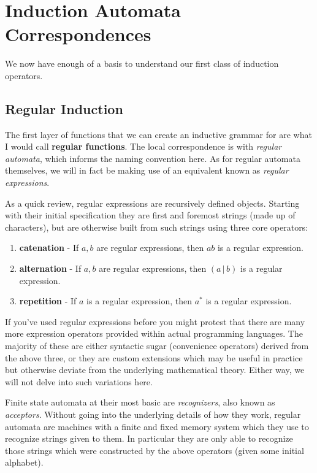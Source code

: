 \documentclass[twoside]{article}
\newcommand{\strong}[1]{{\bfseries #1}}
\begin{document}
\section*{Induction Automata Correspondences}

We now have enough of a basis to understand our first class of induction operators.

\subsection*{Regular Induction}

The first layer of functions that we can create an inductive grammar for are what I would call \strong{regular functions}.
The local correspondence is with \emph{regular automata}, which informs the naming convention here. As for regular
automata themselves, we will in fact be making use of an equivalent known as \emph{regular expressions}.

As a quick review, regular expressions are recursively defined objects. Starting with their initial specification they are
first and foremost strings (made up of characters), but are otherwise built from such strings using three core operators:

\begin{enumerate}
\item {\bfseries catenation} - If $ a, b $ are regular expressions, then $ ab $ is a regular expression.
\item {\bfseries alternation} - If $ a, b $ are regular expressions, then $ (a\,|\,b) $ is a regular expression.
\item {\bfseries repetition} - If $ a $ is a regular expression, then $ a^* $ is a regular expression.
\end{enumerate}

If you've used regular expressions before you might protest that there are many more expression operators provided within
actual programming languages. The majority of these are either syntactic sugar (convenience operators) derived from the
above three, or they are custom extensions which may be useful in practice but otherwise deviate from the underlying
mathematical theory. Either way, we will not delve into such variations here.

Finite state automata at their most basic are \emph{recognizers}, also known as \emph{acceptors}. Without going into
the underlying details of how they work, regular automata are machines with a finite and fixed memory system which
they use to recognize strings given to them. In particular they are only able to recognize those strings which
were constructed by the above operators (given some initial alphabet).
\end{document}
